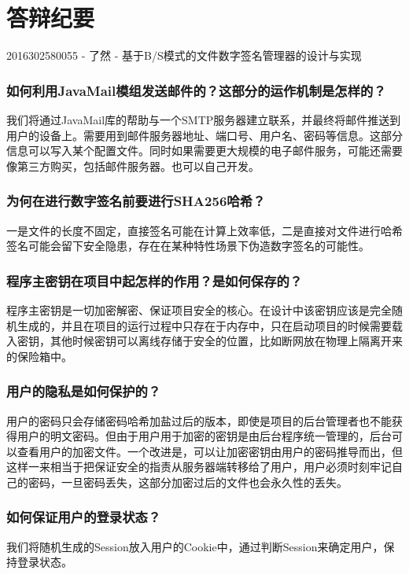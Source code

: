 \documentclass[]{WHUBachelor}
\begin{document}
\chapter*{答辩纪要}

2016302580055 - 了然 - 基于B/S模式的文件数字签名管理器的设计与实现

\subsection*{如何利用JavaMail模组发送邮件的？这部分的运作机制是怎样的？}

我们将通过JavaMail库的帮助与一个SMTP服务器建立联系，并最终将邮件推送到用户的设备上。需要用到邮件服务器地址、端口号、用户名、密码等信息。这部分信息可以写入某个配置文件。同时如果需要更大规模的电子邮件服务，可能还需要像第三方购买，包括邮件服务器。也可以自己开发。

\subsection*{为何在进行数字签名前要进行SHA256哈希？}

一是文件的长度不固定，直接签名可能在计算上效率低，二是直接对文件进行哈希签名可能会留下安全隐患，存在在某种特性场景下伪造数字签名的可能性。

\subsection*{程序主密钥在项目中起怎样的作用？是如何保存的？}

程序主密钥是一切加密解密、保证项目安全的核心。在设计中该密钥应该是完全随机生成的，并且在项目的运行过程中只存在于内存中，只在启动项目的时候需要载入密钥，其他时候密钥可以离线存储于安全的位置，比如断网放在物理上隔离开来的保险箱中。

\subsection*{用户的隐私是如何保护的？}

用户的密码只会存储密码哈希加盐过后的版本，即使是项目的后台管理者也不能获得用户的明文密码。但由于用户用于加密的密钥是由后台程序统一管理的，后台可以查看用户的加密文件。一个改进是，可以让加密密钥由用户的密码推导而出，但这样一来相当于把保证安全的指责从服务器端转移给了用户，用户必须时刻牢记自己的密码，一旦密码丢失，这部分加密过后的文件也会永久性的丢失。

\subsection*{如何保证用户的登录状态？}

我们将随机生成的Session放入用户的Cookie中，通过判断Session来确定用户，保持登录状态。
\end{document}

